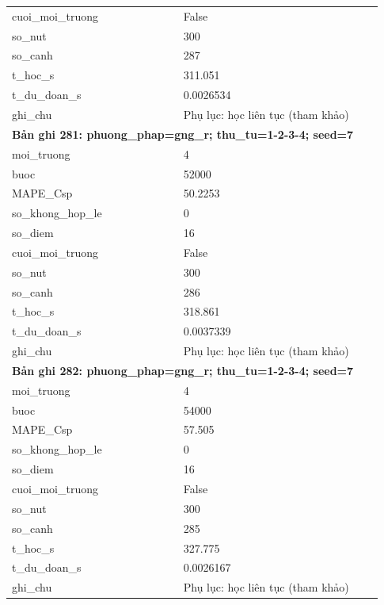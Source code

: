 \begin{longtable}{p{0.43\linewidth}p{0.50\linewidth}}
cuoi\_\allowbreak moi\_\allowbreak truong & False \\
so\_\allowbreak nut & 300 \\
so\_\allowbreak canh & 287 \\
t\_\allowbreak hoc\_\allowbreak s & 311.051 \\
t\_\allowbreak du\_\allowbreak doan\_\allowbreak s & 0.0026534 \\
ghi\_\allowbreak chu & Phụ lục: học liên tục (tham khảo) \\
\midrule
\multicolumn{2}{p{0.95\linewidth}}{\textbf{Bản ghi 281: phuong\_phap=gng\_r; thu\_tu=1-2-3-4; seed=7}} \\
moi\_\allowbreak truong & 4 \\
buoc & 52000 \\
MAPE\_\allowbreak Csp & 50.2253 \\
so\_\allowbreak khong\_\allowbreak hop\_\allowbreak le & 0 \\
so\_\allowbreak diem & 16 \\
cuoi\_\allowbreak moi\_\allowbreak truong & False \\
so\_\allowbreak nut & 300 \\
so\_\allowbreak canh & 286 \\
t\_\allowbreak hoc\_\allowbreak s & 318.861 \\
t\_\allowbreak du\_\allowbreak doan\_\allowbreak s & 0.0037339 \\
ghi\_\allowbreak chu & Phụ lục: học liên tục (tham khảo) \\
\midrule
\multicolumn{2}{p{0.95\linewidth}}{\textbf{Bản ghi 282: phuong\_phap=gng\_r; thu\_tu=1-2-3-4; seed=7}} \\
moi\_\allowbreak truong & 4 \\
buoc & 54000 \\
MAPE\_\allowbreak Csp & 57.505 \\
so\_\allowbreak khong\_\allowbreak hop\_\allowbreak le & 0 \\
so\_\allowbreak diem & 16 \\
cuoi\_\allowbreak moi\_\allowbreak truong & False \\
so\_\allowbreak nut & 300 \\
so\_\allowbreak canh & 285 \\
t\_\allowbreak hoc\_\allowbreak s & 327.775 \\
t\_\allowbreak du\_\allowbreak doan\_\allowbreak s & 0.0026167 \\
ghi\_\allowbreak chu & Phụ lục: học liên tục (tham khảo) \\

\end{longtable}
